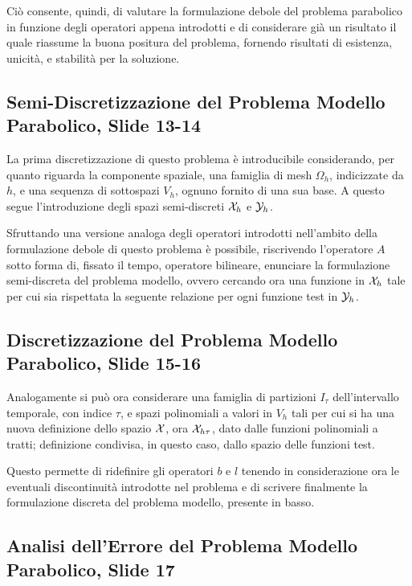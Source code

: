 \documentclass[12pt]{article}
\begin{document}
    Ciò consente, quindi, di valutare la formulazione debole del problema parabolico in funzione degli operatori appena introdotti e di considerare già un risultato il quale riassume la buona positura del problema, fornendo risultati di esistenza, unicità, e stabilità per la soluzione.

    \subsection{Semi-Discretizzazione del Problema Modello Parabolico, Slide 13-14}

    La prima discretizzazione di questo problema è introducibile considerando, per quanto riguarda la componente spaziale, una famiglia di mesh $\Omega_h$, indicizzate da $h$, e una sequenza di sottospazi $V_h$, ognuno fornito di una sua base. A questo segue l'introduzione degli spazi semi-discreti $\mathcal{X}_h$ e $\mathcal{Y}_h$.

    Sfruttando una versione analoga degli operatori introdotti nell'ambito della formulazione debole di questo problema è possibile, riscrivendo l'operatore $A$ sotto forma di, fissato il tempo, operatore bilineare, enunciare la formulazione semi-discreta del problema modello, ovvero cercando ora una funzione in $\mathcal{X}_h$ tale per cui sia rispettata la seguente relazione per ogni funzione test in $\mathcal{Y}_h$.

    \subsection{Discretizzazione del Problema Modello Parabolico, Slide 15-16}

    Analogamente si può ora considerare una famiglia di partizioni $I_{\tau}$ dell'intervallo temporale, con indice $\tau$, e spazi polinomiali a valori in $V_h$ tali per cui si ha una nuova definizione dello spazio $\mathcal{X}$, ora $\mathcal{X}_{h \tau}$, dato dalle funzioni polinomiali a tratti; definizione condivisa, in questo caso, dallo spazio delle funzioni test.

    Questo permette di ridefinire gli operatori $b$ e $l$ tenendo in considerazione ora le eventuali discontinuità introdotte nel problema e di scrivere finalmente la formulazione discreta del problema modello, presente in basso.

    \subsection{Analisi dell'Errore del Problema Modello Parabolico, Slide 17}
\end{document}
